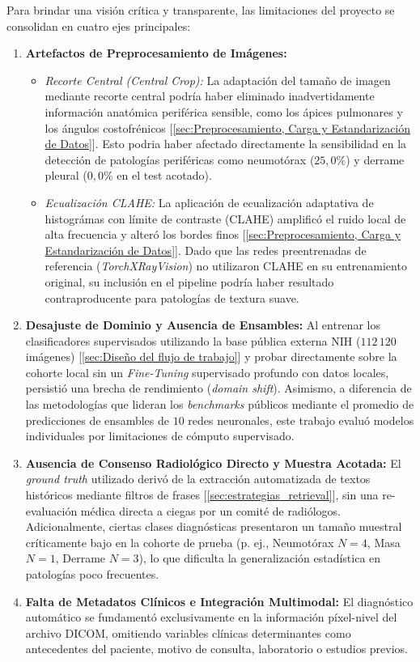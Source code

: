 \documentclass[../tesis.tex]{subfiles}
\begin{document}
Para brindar una visión crítica y transparente, las limitaciones del proyecto se consolidan en cuatro ejes principales:

\begin{enumerate}
    \item \textbf{Artefactos de Preprocesamiento de Imágenes:}
    \begin{itemize}
        \item \textit{Recorte Central (Central Crop):} La adaptación del tamaño de imagen mediante recorte central podría haber eliminado inadvertidamente información anatómica periférica sensible, como los ápices pulmonares y los ángulos costofrénicos [\autoref{sec:Preprocesamiento, Carga y Estandarización de Datos}]. Esto podria haber afectado directamente la sensibilidad en la detección de patologías periféricas como neumotórax ($25{,}0\%$) y derrame pleural ($0{,}0\%$ en el test acotado).
        \item \textit{Ecualización CLAHE:} La aplicación de ecualización adaptativa de histográmas con límite de contraste (CLAHE) amplificó el ruido local de alta frecuencia y alteró los bordes finos [\autoref{sec:Preprocesamiento, Carga y Estandarización de Datos}]. Dado que las redes preentrenadas de referencia (\textit{TorchXRayVision}) no utilizaron CLAHE en su entrenamiento original, su inclusión en el pipeline podría haber resultado contraproducente para patologías de textura suave.
    \end{itemize}

    \item \textbf{Desajuste de Dominio y Ausencia de Ensambles:}
    Al entrenar los clasificadores supervisados utilizando la base pública externa NIH ($112\,120$ imágenes) [\autoref{sec:Diseño del flujo de trabajo}] y probar directamente sobre la cohorte local sin un \textit{Fine-Tuning} supervisado profundo con datos locales, persistió una brecha de rendimiento (\textit{domain shift}). Asimismo, a diferencia de las metodologías que lideran los \textit{benchmarks} públicos mediante el promedio de predicciones de ensambles de $10$ redes neuronales, este trabajo evaluó modelos individuales por limitaciones de cómputo supervisado.

    \item \textbf{Ausencia de Consenso Radiológico Directo y Muestra Acotada:}
    El \textit{ground truth} utilizado derivó de la extracción automatizada de textos históricos mediante filtros de frases [\autoref{sec:estrategias_retrieval}], sin una re-evaluación médica directa a ciegas por un comité de radiólogos. Adicionalmente, ciertas clases diagnósticas presentaron un tamaño muestral críticamente bajo en la cohorte de prueba (p. ej., Neumotórax $N=4$, Masa $N=1$, Derrame $N=3$), lo que dificulta la generalización estadística en patologías poco frecuentes.

    \item \textbf{Falta de Metadatos Clínicos e Integración Multimodal:}
    El diagnóstico automático se fundamentó exclusivamente en la información píxel-nivel del archivo DICOM, omitiendo variables clínicas determinantes como antecedentes del paciente, motivo de consulta, laboratorio o estudios previos.
\end{enumerate}
\end{document}

